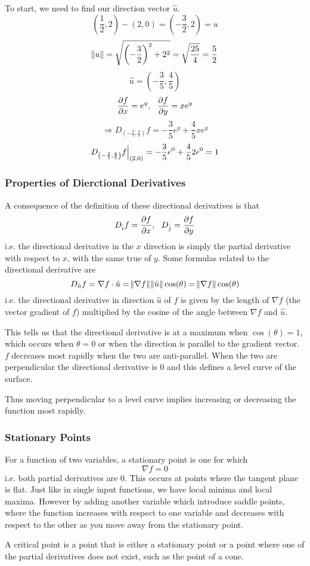 \documentclass[12pt]{report}
\begin{document}
\begin{flushleft}
\begin{center}
    To start, we need to find our direction vector \(\hat{u}\).
    \[\left(\frac{1}{2}, 2\right) - (2, 0) = \left(-\frac{3}{2}, 2\right) = u\]
    \[\norm{u} = \sqrt{\left(-\frac{3}{2}\right)^2 + 2^2}
    = \sqrt{\frac{25}{4}} = \frac{5}{2}\]
    \[\hat{u} = \left(-\frac{3}{5}, \frac{4}{5}\right)\]
    \[\frac{\partial f}{\partial x} = e^y, \:\:\: \frac{\partial f}{\partial y} = xe^y\]
    \[\Rightarrow D_{\left(-\frac{3}{5}, \frac{4}{5}\right)}f = 
    -\frac{3}{5}e^y + \frac{4}{5}xe^y\]
    \[D_{\left(-\frac{3}{5}, \frac{4}{5}\right)}f\Bigr\rvert_{(2, 0)} = 
    -\frac{3}{5}e^0 + \frac{4}{5}2e^0 = 1\]
\end{center}

\subsubsection*{Properties of Dierctional Derivatives}

A consequence of the definition of these directional derivatives is that
\[D_{\hat{i}}f = \frac{\partial f}{\partial x}, \:\:\: D_{\hat{j}} = \frac{\partial f}{\partial y}\]
i.e. the directional derivative in the \(x\) direction is simply the partial
derivative with respect to \(x\), with the same true of \(y\). Some formulas
related to the directional derivative are
\[D_{\hat{u}}f = \nabla f\cdot\hat{u}
= \norm{\nabla f}\norm{\hat{u}}\cos(\theta) = \norm{\nabla f}\cos(\theta)\]
i.e. the directional derivative in direction \(\hat{u}\) of \(f\) is given by
the length of \(\nabla f\) (the vector gradient of \(f\)) multiplied by the
cosine of the angle between \(\nabla f\) and \(\hat{u}\). \par
This tells us that the directional derivative is at a maximum when
\(\cos(\theta) = 1\), which occurs when \(\theta = 0\) or when the direction
is parallel to the gradient vector. \(f\) decreases most rapidly when the two
are anti-parallel. When the two are perpendicular the directional derivative
is \(0\) and this defines a level curve of the surface. \par
Thus moving perpendicular to a level curve implies increasing or decreasing the
function most rapidly.

\subsubsection*{Stationary Points}

For a function of two variables, a stationary point is one for which
\[\nabla f = 0\]
i.e. both partial derivatives are \(0\). This occurs at points where the
tangent plane is flat. Just like in single input functions, we have local
minima and local maxima. However by adding another variable which introduce
saddle points, where the function increases with respect to one variable
and decreases with respect to the other as you move away from the stationary
point. \par
A critical point is a point that is either a stationary point or a point where
one of the partial derivatives does not exist, such as the point of a cone.


\end{flushleft}
\end{document}
